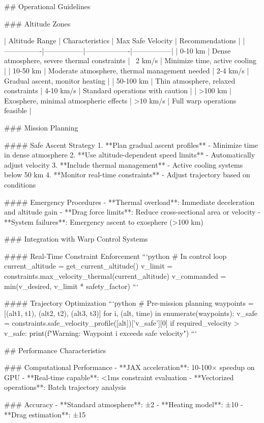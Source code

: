 ## Operational Guidelines

### Altitude Zones

| Altitude Range | Characteristics | Max Safe Velocity | Recommendations |
|----------------|-----------------|-------------------|-----------------|
| 0-10 km | Dense atmosphere, severe thermal constraints | ~2 km/s | Minimize time, active cooling |
| 10-50 km | Moderate atmosphere, thermal management needed | 2-4 km/s | Gradual ascent, monitor heating |
| 50-100 km | Thin atmosphere, relaxed constraints | 4-10 km/s | Standard operations with caution |
| >100 km | Exosphere, minimal atmospheric effects | >10 km/s | Full warp operations feasible |

### Mission Planning

#### Safe Ascent Strategy
1. **Plan gradual ascent profiles** - Minimize time in dense atmosphere
2. **Use altitude-dependent speed limits** - Automatically adjust velocity
3. **Include thermal management** - Active cooling systems below 50 km
4. **Monitor real-time constraints** - Adjust trajectory based on conditions

#### Emergency Procedures
- **Thermal overload**: Immediate deceleration and altitude gain
- **Drag force limits**: Reduce cross-sectional area or velocity
- **System failures**: Emergency ascent to exosphere (>100 km)

### Integration with Warp Control Systems

#### Real-Time Constraint Enforcement
```python
# In control loop
current_altitude = get_current_altitude()
v_limit = constraints.max_velocity_thermal(current_altitude)
v_commanded = min(v_desired, v_limit * safety_factor)
```

#### Trajectory Optimization
```python
# Pre-mission planning
waypoints = [(alt1, t1), (alt2, t2), (alt3, t3)]
for i, (alt, time) in enumerate(waypoints):
    v_safe = constraints.safe_velocity_profile([alt])['v_safe'][0]
    if required_velocity > v_safe:
        print(f"Warning: Waypoint {i} exceeds safe velocity")
```

## Performance Characteristics

### Computational Performance
- **JAX acceleration**: 10-100× speedup on GPU
- **Real-time capable**: <1ms constraint evaluation
- **Vectorized operations**: Batch trajectory analysis

### Accuracy
- **Standard atmosphere**: ±2%
- **Heating model**: ±10%
- **Drag estimation**: ±15%

